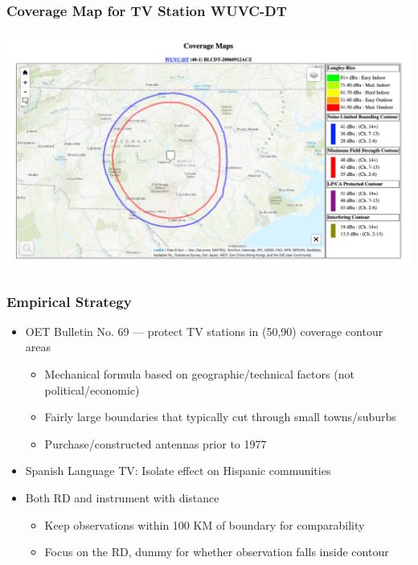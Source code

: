\documentclass{beamer}
\begin{document}
\begin{frame}
\frametitle{Coverage Map for TV Station WUVC-DT}
\centering
        \includegraphics[width=1\textwidth]{../../analysis/Output/img/ContourExample.png}\\
\end{frame}

\begin{frame}
\frametitle{Empirical Strategy}
\begin{itemize}

\item OET Bulletin No. 69 --- protect TV stations in (50,90) coverage contour areas
\begin{itemize}
\item Mechanical formula based on geographic/technical factors (not political/economic)
\item Fairly large boundaries that typically cut through small towns/suburbs
\item Purchase/constructed antennas prior to 1977
\end{itemize}
\item Spanish Language TV: Isolate effect on Hispanic communities
\item Both RD and instrument with distance
\begin{itemize}
\item Keep observations within 100 KM of boundary for comparability
\item Focus on the RD, dummy for whether observation falls inside contour
\end{itemize}

\end{itemize}

\end{frame}
\end{document}
